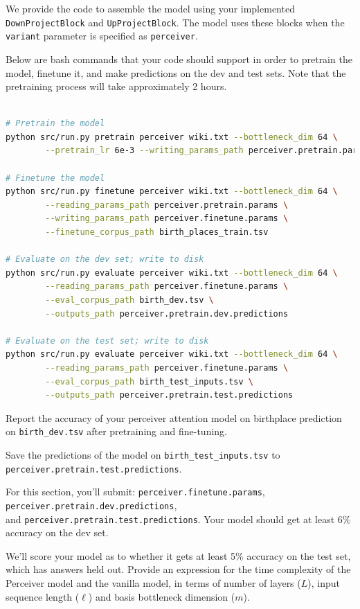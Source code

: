 \begin{parts}
We provide the code to assemble the model using your implemented \texttt{DownProjectBlock} and \texttt{UpProjectBlock}. The model uses these blocks when the \texttt{variant} parameter is specified as \texttt{perceiver}.


Below are bash commands that your code should support in order to pretrain the model, finetune it, and make predictions on the dev and test sets.
Note that the pretraining process will take approximately 2 hours. 
\clearpage
\begin{lstlisting}[basicstyle=\ttfamily, language=bash]

# Pretrain the model
python src/run.py pretrain perceiver wiki.txt --bottleneck_dim 64 \
        --pretrain_lr 6e-3 --writing_params_path perceiver.pretrain.params
        
# Finetune the model
python src/run.py finetune perceiver wiki.txt --bottleneck_dim 64 \
        --reading_params_path perceiver.pretrain.params \
        --writing_params_path perceiver.finetune.params \
        --finetune_corpus_path birth_places_train.tsv
        
# Evaluate on the dev set; write to disk
python src/run.py evaluate perceiver wiki.txt --bottleneck_dim 64 \
        --reading_params_path perceiver.finetune.params \
        --eval_corpus_path birth_dev.tsv \
        --outputs_path perceiver.pretrain.dev.predictions
        
# Evaluate on the test set; write to disk
python src/run.py evaluate perceiver wiki.txt --bottleneck_dim 64 \
        --reading_params_path perceiver.finetune.params \
        --eval_corpus_path birth_test_inputs.tsv \
        --outputs_path perceiver.pretrain.test.predictions
\end{lstlisting}

Report the accuracy of your perceiver attention model on birthplace prediction on \texttt{birth\_dev.tsv} after pretraining and fine-tuning.

Save the predictions of the model on \texttt{birth\_test\_inputs.tsv} to \texttt{perceiver.pretrain.test.predictions}.

For this section, you'll submit: \texttt{perceiver.finetune.params}, \texttt{perceiver.pretrain.dev.predictions},\\ and \texttt{perceiver.pretrain.test.predictions}. Your model should get at least 6\% accuracy on the dev set.
    
\begin{subparts}

\subpart[8]  We'll score your model as to whether it gets at least 5\% accuracy on the test set, which has answers held out.
\subpart[2] Provide an expression for the time complexity of the Perceiver model and the vanilla model, in terms of number of layers ($L$), input sequence length ($\ell$) and basis bottleneck dimension ($m$). 

\ifans{}


\end{subparts}
\end{parts}

